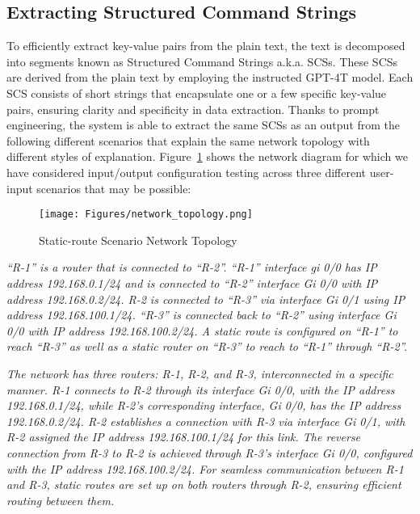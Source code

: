 \vspace{-2mm}
\subsection{Extracting Structured Command Strings}
To efficiently extract key-value pairs from the plain text, the text is decomposed into segments known as Structured Command Strings a.k.a. SCSs. These SCSs are derived from the plain text by employing the instructed GPT-4T model. Each SCS consists of short strings that encapsulate one or a few specific key-value pairs, ensuring clarity and specificity in data extraction.
Thanks to prompt engineering, the system is able to extract the same SCSs as an output from the following different scenarios that explain the same network topology with different styles of explanation. Figure~\ref{fig: network topology} shows the network diagram for which we have considered input/output configuration testing across three different user-input scenarios that may be possible:

\begin{figure}[t!]
    \centering
    \texttt{[image: Figures/network\_topology.png]}
    \caption{Static-route Scenario Network Topology}
    \vspace{-6mm}
    \label{fig: network topology}
\end{figure}

\vspace{1mm}
\textit{“R-1” is a router that is connected to “R-2”. “R-1” interface gi 0/0 has IP address 192.168.0.1/24 and is connected to  “R-2” interface Gi 0/0 with IP address 192.168.0.2/24. 
R-2 is connected to “R-3” via interface Gi 0/1 using IP address 192.168.100.1/24. “R-3” is connected back to “R-2” using interface Gi 0/0 with IP address 192.168.100.2/24. 
A static route is configured on “R-1” to reach “R-3” as well as a static router on “R-3” to reach to “R-1” through “R-2”.}


\vspace{1mm}
\textit{The network has three routers: R-1, R-2, and R-3, interconnected in a specific manner.
R-1 connects to R-2 through its interface Gi 0/0, with the IP address 192.168.0.1/24, while R-2's corresponding interface, Gi 0/0, has the IP address 192.168.0.2/24.
R-2 establishes a connection with R-3 via interface Gi 0/1, with R-2 assigned the IP address 192.168.100.1/24 for this link.
The reverse connection from R-3 to R-2 is achieved through R-3's interface Gi 0/0, configured with the IP address 192.168.100.2/24.
For seamless communication between R-1 and R-3, static routes are set up on both routers through R-2, ensuring efficient routing between them.}


